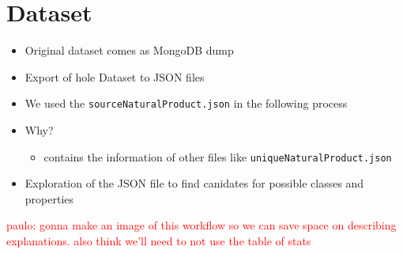 \documentclass[
]{ceurart}
\begin{document}
\begin{table}[h]
    \centering
    \caption{Resources described in this paper.}
    \label{tab:resources}
\end{table}

\section{Dataset}
\begin{itemize}
    \item Original dataset comes as MongoDB dump
    \item Export of hole Dataset to JSON files
    \item We used the \texttt{sourceNaturalProduct.json} in the following process
    \item Why?
    \begin{itemize}
        \item contains the information of other files like \texttt{uniqueNaturalProduct.json}
    \end{itemize}
    \item Exploration of the JSON file to find canidates for possible classes and properties
\end{itemize}

\textcolor{red}{paulo: gonna make an image of this workflow so we can save space on describing explanations. also think we'll need to not use the table of stats}
\end{document}
